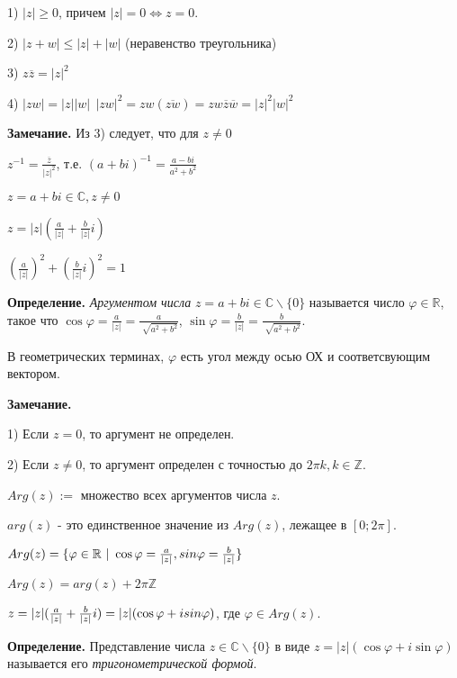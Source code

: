 1) $|z| \geq 0$, причем $|z| = 0 \Leftrightarrow z = 0$.

2) $ |z + w| \leq |z| + |w|$ (неравенство треугольника)

3) $z \overline{z} = |z|^2$

4) $|zw| = |z||w| \ \ |zw|^2 = zw(\overline{zw}) = zw \overline{z} \overline{w} =  |z|^2 |w|^2$

\vspace{\baselineskip}
\textbf{Замечание.} Из 3) следует, что для $z \neq 0$

$z^{-1} = \frac{\overline{z}}{|z|^2}$, т.е. $(a + bi)^{-1} = \frac{a-bi}{a^2 + b^2}$

\vspace{\baselineskip}
$z = a + bi \in \mathbb{C}, z \neq 0$

$z = |z| (\frac{a}{|z|} + \frac{b}{|z|}i)$

$(\frac{a}{|z|})^2 + (\frac{b}{|z|}i)^2 = 1$

\vspace{\baselineskip}
\textbf{Определение.} \textit{Аргументом числа} $z = a + bi \in \mathbb{C} \backslash \{0\}$ называется число $\varphi \in \mathbb{R}$, такое что $\cos \varphi = \frac{a}{|z|} = \frac{a} {\sqrt[]{a^2 + b^2}}$, $\sin \varphi = \frac{b}{|z|} = \frac{b}{\sqrt[]{a^2 + b^2}}$.

В геометрических терминах, $\varphi$ есть угол между осью ОХ и соответсвующим вектором.

\vspace{\baselineskip}
\textbf{Замечание.} 

1) Если $z = 0$, то аргумент не определен.

2) Если $z \neq 0$, то аргумент определен с точностью до $2 \pi k, k \in \mathbb{Z}$.

\vspace{\baselineskip}
$Arg(z) :=$ множество всех аргументов числа $z$.

$arg(z)$ - это единственное значение из $Arg(z)$, лежащее в $[0;2 \pi]$.

$Arg(z) = \{ \varphi \in \mathbb{R} \ | \ \cos \varphi = \frac{a}{|z|}, \\sin \varphi = \frac{b}{|z|} \}$

$Arg(z) = arg(z) + 2 \pi \mathbb{Z}$

$z = |z| (\frac{a}{|z|} + \frac{b}{|z|} i) = |z| (\cos \varphi + i \\sin \varphi)$, где $\varphi \in Arg(z)$.

\vspace{\baselineskip}
\textbf{Определение.} Представление числа $z \in \mathbb{C} \backslash \{0 \}$ в виде $z = |z|(\cos \varphi + i \sin \varphi)$ называется его \textit{тригонометрической формой}.


